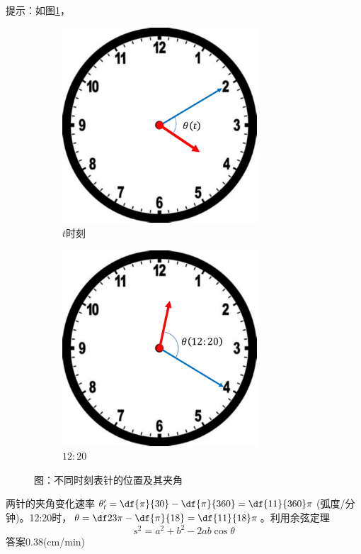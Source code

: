 提示：如图\ref{fig:clockFace}，
\begin{figure}[h]
	\centering
	\begin{subfigure}[t]{0.4\textwidth}
		\centering
		\includegraphics[width=0.8\textwidth]
		{./Images/Ch02/clockFace1.pdf}
		\caption{$t$时刻}
	\end{subfigure}
	\begin{subfigure}[t]{0.4\textwidth}
		\centering
		\includegraphics[width=0.8\textwidth]
		{./Images/Ch02/clockFace2.pdf}
		\caption{$12:20$}
	\end{subfigure}
	\caption{\exNo 图：不同时刻表针的位置及其夹角}
	\label{fig:clockFace}
\end{figure}
两针的夹角变化速率$\theta'_t=\df{\pi}{30}-\df{\pi}{360}
=\df{11}{360}\pi$(弧度/分钟)。12:20时，$\theta=\df23\pi-\df{\pi}{18}
=\df{11}{18}\pi$。利用余弦定理
$$s^2=a^2+b^2-2ab\cos\theta$$
答案$0.38$(cm/min)

